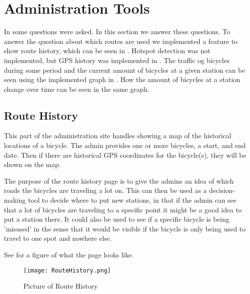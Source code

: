 \section{Administration Tools}\label{sec:impAdminTools}
In  some questions were asked. 
In this section we answer these questions.
To answer the question about which routes are used we implemented a feature to show route history, which can be seen in .
Hotspot detection was not implemented, but GPS history was implemented in .
The traffic og bicycles during some period and the current amount of bicycles at a given station can be seen using the implemented graph in .
How the amount of bicycles at a station change over time can be seen in the same graph.



\subsection{Route History}\label{sec:routeHistory}
This part of the administration site handles showing a map of the historical locations of a bicycle.
The admin provides one or more bicycles, a start, and end date.
Then if there are historical GPS coordinates for the bicycle(s), they will be shown on the map. 

The purpose of the route history page is to give the admins an idea of which roads the bicycles are traveling a lot on. 
This can then be used as a decision-making tool to decide where to put new stations, in that if the admin can see that a lot of bicycles are traveling to a specific point it might be a good idea to put a station there.
It could also be used to see if a specific bicycle is being 'misused' in the sense that it would be visible if the bicycle is only being used to travel to one spot and nowhere else.

See  for a figure of what the page looks like.

\begin{figure}[H]
	\centering
	\texttt{[image: RouteHistory.png]}
	\caption{Picture of Route History}
	\label{fig:routehistory}
\end{figure}

